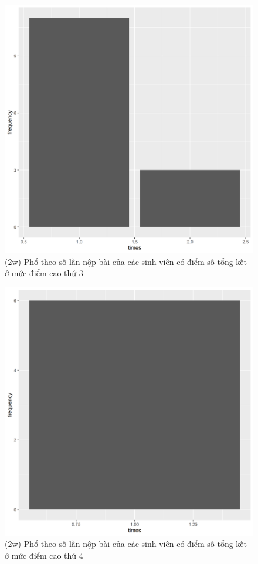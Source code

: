 \documentclass[a4paper]{article}
\theoremstyle{definition}
\begin{document}
\begin{figure}[!ht]
    \centering
    \includegraphics[scale=0.4]{Pics/q2w-3-file3.png}
    \caption{(2w) Phổ theo số lần nộp bài của các sinh viên có điểm số tổng kết ở mức điểm cao thứ $3$}
    \label{fig:my_label}
\end{figure}
\begin{figure}[!ht]
    \centering
    \includegraphics[scale=0.4]{Pics/q2w-4-file3.png}
    \caption{(2w) Phổ theo số lần nộp bài của các sinh viên có điểm số tổng kết ở mức điểm cao thứ $4$}
    \label{fig:my_label}
\end{figure}
\end{document}
